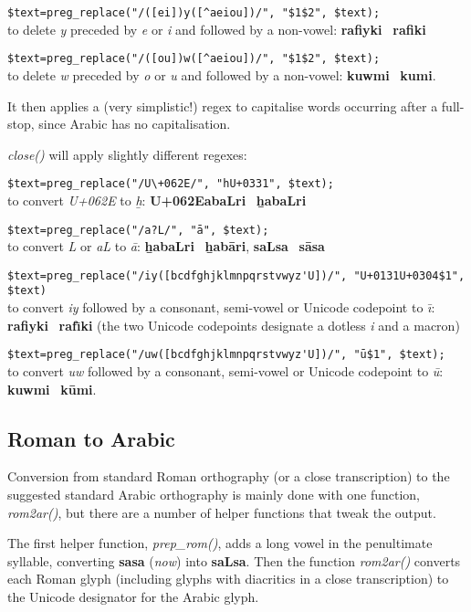 \verb|$text=preg_replace("/([ei])y([^aeiou])/", "$1$2", $text);|\\
to delete \textit{y} preceded by \textit{e} or \textit{i} and followed by a non-vowel: \textbf{rafiyki} \textrightarrow\ \textbf{rafiki}

\verb|$text=preg_replace("/([ou])w([^aeiou])/", "$1$2", $text);|\\
to delete \textit{w} preceded by \textit{o} or \textit{u} and followed by a non-vowel: \textbf{kuwmi} \textrightarrow\ \textbf{kumi}.

It then applies a (very simplistic!) regex to capitalise words occurring after a full-stop, since Arabic has no capitalisation.

\textit{close()} will apply slightly different regexes:

\verb|$text=preg_replace("/U\+062E/", "hU+0331", $text);|\\
to convert \textit{U+062E} to \textit{ẖ}: \textbf{U+062EabaLri} \textrightarrow\ \textbf{ẖabaLri}

\verb|$text=preg_replace("/a?L/", "ā", $text);|\\
to convert \textit{L} or \textit{aL} to \textit{ā}: \textbf{ẖabaLri} \textrightarrow\ \textbf{ẖabāri}, \textbf{saLsa} \textrightarrow\ \textbf{sāsa}

\verb|$text=preg_replace("/iy([bcdfghjklmnpqrstvwyz'U])/", "U+0131U+0304$1", $text)|\\
to convert \textit{iy} followed by a consonant, semi-vowel or Unicode codepoint to \textit{ı̄}: \textbf{rafiyki} \textrightarrow\ \textbf{rafı̄ki} (the two Unicode codepoints designate a dotless \textit{i} and a macron)

\verb|$text=preg_replace("/uw([bcdfghjklmnpqrstvwyz'U])/", "ū$1", $text);|\\
to convert \textit{uw} followed by a consonant, semi-vowel or Unicode codepoint to \textit{ū}: \textbf{kuwmi} \textrightarrow\ \textbf{kūmi}.

\subsection{Roman to Arabic}

Conversion from standard Roman orthography (or a close transcription) to the suggested standard Arabic orthography is mainly done with one function, \textit{rom2ar()}, but there are a number of helper functions that tweak the output.

The first helper function, \textit{prep\_rom()}, adds a long vowel in the penultimate syllable, converting \textbf{sasa} (\textit{now}) into \textbf{saLsa}.  Then the function \textit{rom2ar()} converts each Roman glyph (including glyphs with diacritics in a close transcription) to the Unicode designator for the Arabic glyph.

